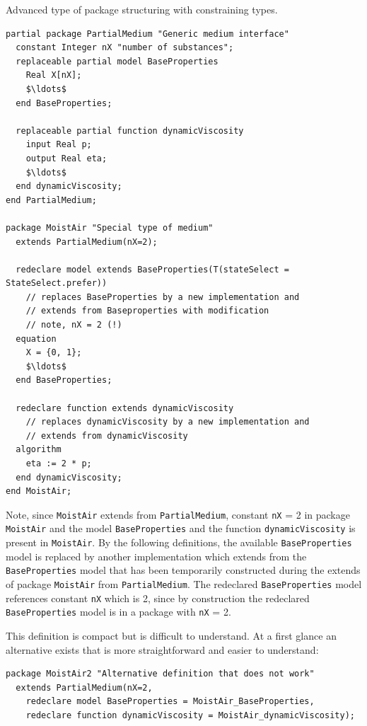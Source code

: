 \begin{example}
Advanced type of package structuring with constraining types.
\begin{lstlisting}[language=modelica]
partial package PartialMedium "Generic medium interface"
  constant Integer nX "number of substances";
  replaceable partial model BaseProperties
    Real X[nX];
    $\ldots$
  end BaseProperties;

  replaceable partial function dynamicViscosity
    input Real p;
    output Real eta;
    $\ldots$
  end dynamicViscosity;
end PartialMedium;

package MoistAir "Special type of medium"
  extends PartialMedium(nX=2);

  redeclare model extends BaseProperties(T(stateSelect = StateSelect.prefer))
    // replaces BaseProperties by a new implementation and
    // extends from Baseproperties with modification
    // note, nX = 2 (!)
  equation
    X = {0, 1};
    $\ldots$
  end BaseProperties;

  redeclare function extends dynamicViscosity
    // replaces dynamicViscosity by a new implementation and
    // extends from dynamicViscosity
  algorithm
    eta := 2 * p;
  end dynamicViscosity;
end MoistAir;
\end{lstlisting}

Note, since \lstinline!MoistAir! extends from \lstinline!PartialMedium!, constant \lstinline!nX! = 2 in package \lstinline!MoistAir! and the model \lstinline!BaseProperties! and the function \lstinline!dynamicViscosity! is present in \lstinline!MoistAir!.
By the following definitions, the available \lstinline!BaseProperties! model is replaced by another implementation which extends from the \lstinline!BaseProperties! model that has been temporarily constructed during the extends of package \lstinline!MoistAir! from \lstinline!PartialMedium!.
The redeclared \lstinline!BaseProperties! model references constant \lstinline!nX! which is 2, since by construction the redeclared \lstinline!BaseProperties! model is in a package with \lstinline!nX! = 2.

This definition is compact but is difficult to understand.
At a first glance an alternative exists that is more straightforward and easier to understand:
\begin{lstlisting}[language=modelica]
package MoistAir2 "Alternative definition that does not work"
  extends PartialMedium(nX=2,
    redeclare model BaseProperties = MoistAir_BaseProperties,
    redeclare function dynamicViscosity = MoistAir_dynamicViscosity);


\end{lstlisting}
\end{example}
